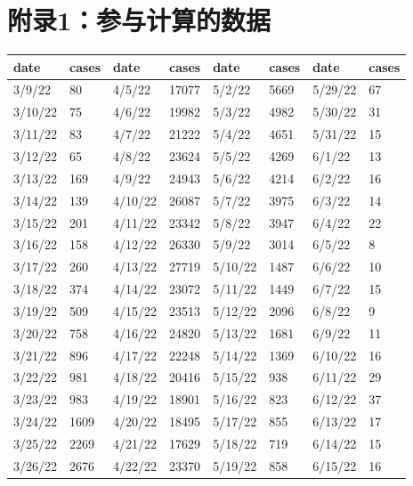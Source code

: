 \documentclass[a4paper,12pt,onecolumn,twoside]{article}
\begin{document}
\section*{附录1：参与计算的数据}
\begin{table}[H]
	\centering
	\begin{tabular}{ll|ll|ll|ll} 
		\hline
		date    & cases & date    & cases & date    & cases & date    & cases  \\ 
		\hline
		3/9/22  & 80    & 4/5/22  & 17077 & 5/2/22  & 5669  & 5/29/22 & 67     \\
		3/10/22 & 75    & 4/6/22  & 19982 & 5/3/22  & 4982  & 5/30/22 & 31     \\
		3/11/22 & 83    & 4/7/22  & 21222 & 5/4/22  & 4651  & 5/31/22 & 15     \\
		3/12/22 & 65    & 4/8/22  & 23624 & 5/5/22  & 4269  & 6/1/22  & 13     \\
		3/13/22 & 169   & 4/9/22  & 24943 & 5/6/22  & 4214  & 6/2/22  & 16     \\
		3/14/22 & 139   & 4/10/22 & 26087 & 5/7/22  & 3975  & 6/3/22  & 14     \\
		3/15/22 & 201   & 4/11/22 & 23342 & 5/8/22  & 3947  & 6/4/22  & 22     \\
		3/16/22 & 158   & 4/12/22 & 26330 & 5/9/22  & 3014  & 6/5/22  & 8      \\
		3/17/22 & 260   & 4/13/22 & 27719 & 5/10/22 & 1487  & 6/6/22  & 10     \\
		3/18/22 & 374   & 4/14/22 & 23072 & 5/11/22 & 1449  & 6/7/22  & 15     \\
		3/19/22 & 509   & 4/15/22 & 23513 & 5/12/22 & 2096  & 6/8/22  & 9      \\
		3/20/22 & 758   & 4/16/22 & 24820 & 5/13/22 & 1681  & 6/9/22  & 11     \\
		3/21/22 & 896   & 4/17/22 & 22248 & 5/14/22 & 1369  & 6/10/22 & 16     \\
		3/22/22 & 981   & 4/18/22 & 20416 & 5/15/22 & 938   & 6/11/22 & 29     \\
		3/23/22 & 983   & 4/19/22 & 18901 & 5/16/22 & 823   & 6/12/22 & 37     \\
		3/24/22 & 1609  & 4/20/22 & 18495 & 5/17/22 & 855   & 6/13/22 & 17     \\
		3/25/22 & 2269  & 4/21/22 & 17629 & 5/18/22 & 719   & 6/14/22 & 15     \\
		3/26/22 & 2676  & 4/22/22 & 23370 & 5/19/22 & 858   & 6/15/22 & 16     \\

\end{tabular}
\end{table}
\end{document}
